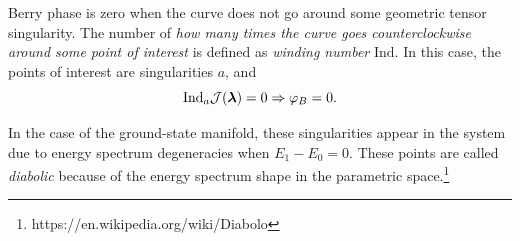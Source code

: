 Berry phase is zero when the curve does not go around some geometric tensor singularity. The number of \emph{how many times the curve goes counterclockwise around some point of interest} is defined as \emph{winding number} $\mathrm{Ind}$. In this case, the points of interest are singularities $a$, and
$$\mathrm{Ind}_a \mathcal J({\bm\lambda})=0 \Rightarrow \varphi_B=0.$$

In the case of the ground-state manifold, these singularities appear in the system due to energy spectrum degeneracies when $E_1-E_0=0$. These points are called \emph{diabolic} because of the energy spectrum shape in the parametric space.\footnote{https://en.wikipedia.org/wiki/Diabolo}